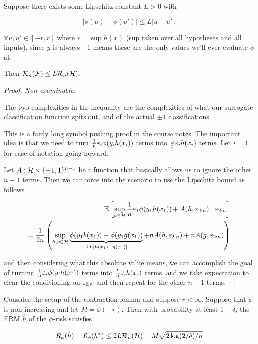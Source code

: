 \documentclass[11pt]{scrartcl}
\begin{document}
\begin{lemma}
Suppose there exists some Lipschitz constant $L>0$ with

\begin{equation}
    |\phi(u) - \phi(u')| \le L|u-u'|.
\end{equation}

$\forall u, u' \in [-r,r]$ where $r = \sup h(x)$ (sup taken over all hypotheses and all inputs), since $y$ is always $\pm 1$ means these are the only values we'll ever evaluate $\phi$ at.

Then $\mathcal{R}_n (\mathcal{F}) \le L \mathcal{R}_n(\mathcal{H})$.

\begin{proof}
\textit{Non-examinable}.

The two complexities in the inequality are the complexities of what our surrogate classification function spits out, and of the actual $\pm 1$ classifications.

This is a fairly long symbol pushing proof in the course notes. The important idea is that we need to turn $\frac1n \varepsilon_i \phi(y_i h(x_i))$ terms into $\frac{L}{n}\varepsilon_i h(x_i)$ terms. Let $i=1$ for ease of notation going forward.

Let $A : \mathcal{H} \times \{ -1, 1\}^{n-1}$ be a function that basically allows us to ignore the other $n-1$ terms. Then we can force into the scenario to use the Lipschitz bound as follows

\begin{align}
    \mathbb{E} \left[ \sup_{h \in \mathcal{H}} \frac1n \varepsilon_1 \phi(y_1h(x_1)) + A(h, \varepsilon_{2:n}) \mid \varepsilon_{2:n} \right] \\
    = \frac{1}{2n} \left( \sup_{h, g \in \mathcal{H}}{ \underbrace{\phi(y_1h(x_1)) - \phi(y_1g(x_1))}_{\le L |h(x_1) - g(x_1)|} + nA(h,\varepsilon_{2:n}) + nA(g,\varepsilon_{2:n})} \right)
\end{align}

and then considering what this absolute value means, we can accomplish the goal of turning $\frac1n \varepsilon_i \phi(y_i h(x_i))$ terms into $\frac{L}{n}\varepsilon_i h(x_i)$ terms, and we take expectation to clear the conditioning on $\varepsilon_{2:n}$ and then repeat for the other $n-1$ terms.


\end{proof}
\end{lemma}

\begin{corollary}
\label{classic bound with phi}
Consider the setup of the contraction lemma and suppose $r < \infty$. Suppose that $\phi$ is non-increasing and let $M = \phi(-r)$. Then with probability at least $1 - \delta$, the ERM $\hat{h}$ of the $\phi$-risk satisfies 

\begin{equation}
\label{phi risk bound apapt}
    R_\phi(\hat{h}) - R_\phi(h^*) \le 2 L \mathcal{R}_n(\mathcal{H}) + M \sqrt{ 2 \log (2/\delta) / n }
\end{equation}
\end{corollary}
\end{document}
